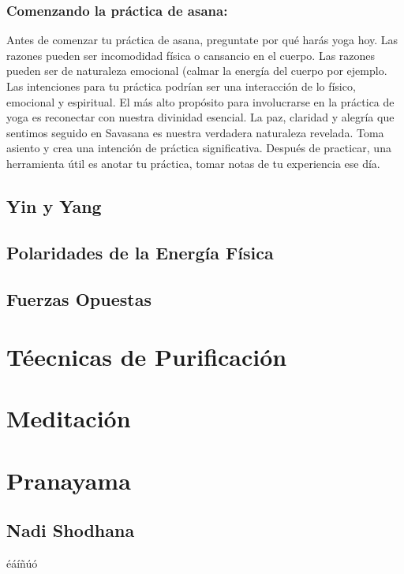 \subsubsection{Comenzando la práctica de asana:}
Antes de comenzar tu práctica de asana, preguntate por qué harás yoga hoy. Las razones pueden ser incomodidad física o cansancio en el cuerpo. Las razones pueden ser de naturaleza emocional (calmar la energía del cuerpo por ejemplo. Las intenciones para tu práctica podrían ser una interacción de lo físico, emocional y espiritual. El más alto propósito para involucrarse en la práctica de yoga es reconectar con nuestra divinidad esencial. La paz, claridad y alegría que sentimos seguido en Savasana es nuestra verdadera naturaleza revelada. Toma asiento y crea una intención de práctica significativa. Después de practicar, una herramienta útil es anotar tu práctica, tomar notas de tu experiencia ese día.

\subsection{Yin y Yang}
\subsection{Polaridades de la Energía Física}
\subsection{Fuerzas Opuestas}
\section{Téecnicas de Purificación}
\section{Meditación}
\section{Pranayama}
\subsection{Nadi Shodhana}


éáíñúó



























